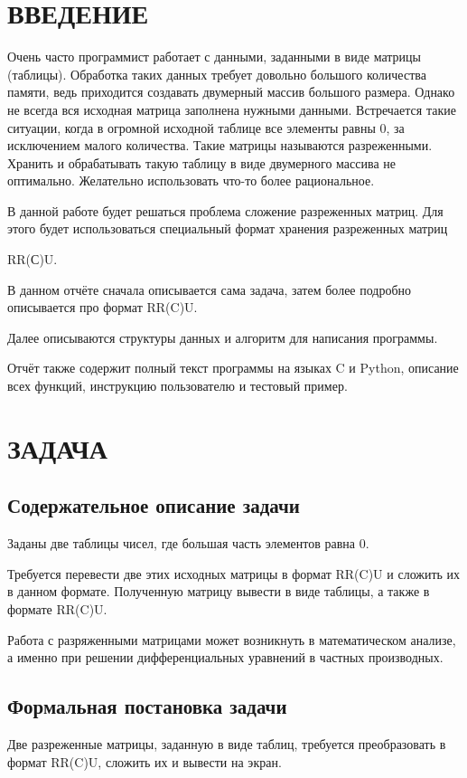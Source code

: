 

\setcounter{page}{2}
\normalfont
\tableofcontents
\clearpage
\section*{ВВЕДЕНИЕ}
Очень часто программист работает с данными, заданными в виде матрицы (таблицы). Обработка таких данных требует довольно большого количества памяти, ведь приходится создавать двумерный массив большого размера. Однако не всегда вся исходная матрица заполнена нужными данными. Встречается такие ситуации, когда в огромной исходной таблице все элементы равны 0, за исключением малого количества. Такие матрицы называются разреженными. Хранить и обрабатывать такую таблицу в виде двумерного массива не оптимально. Желательно использовать что-то более рациональное.

В данной работе будет решаться проблема сложение разреженных матриц. Для этого будет использоваться специальный формат хранения разреженных матриц 

RR(С)U.

В данном отчёте сначала описывается сама задача, затем более подробно описывается про формат RR(C)U. 

Далее описываются структуры данных и алгоритм для написания программы.

Отчёт также содержит полный текст программы на языках C и Python, описание всех функций, инструкцию пользователю и тестовый пример. 

\clearpage
\section{ЗАДАЧА}
\subsection{Содержательное описание задачи}
Заданы две таблицы чисел, где большая часть элементов равна 0.

Требуется перевести две этих исходных матрицы в формат RR(C)U и сложить их в данном формате. Полученную  матрицу вывести в виде таблицы, а также в формате RR(C)U. 

Работа с разряженными матрицами может возникнуть в математическом анализе, а именно при решении дифференциальных уравнений в частных производных.

\subsection{Формальная постановка задачи}
Две разреженные матрицы, заданную в виде таблиц, требуется преобразовать в формат RR(C)U, сложить их и вывести на экран.


